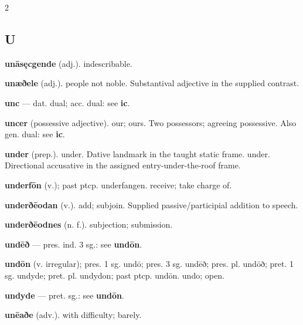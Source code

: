 \begin{multicols*}{2}
\subsection*{U}
\textbf{unāsęcgende} (adj.). indescribable.\par
\textbf{unæðele} (adj.). people not noble. Substantival adjective in the supplied contrast.\par
\textbf{unc} — dat. dual; acc. dual: see \textbf{ic}.\par
\textbf{uncer} (possessive adjective). our; ours. Two possessors; agreeing possessive. Also gen. dual: see \textbf{ic}.\par
\textbf{under} (prep.). under. Dative landmark in the taught static frame. under. Directional accusative in the assigned entry-under-the-roof frame.\par
\textbf{underfōn} (v.); past ptcp. underfangen. receive; take charge of.\par
\textbf{underðēodan} (v.). add; subjoin. Supplied passive/participial addition to speech.\par
\textbf{underðēodnes} (n. f.). subjection; submission.\par
\textbf{undēð} — pres. ind. 3 sg.: see \textbf{undōn}.\par
\textbf{undōn} (v. irregular); pres. 1 sg. undō; pres. 3 sg. undēð; pres. pl. undōð; pret. 1 sg. undyde; pret. pl. undydon; past ptcp. undōn. undo; open.\par
\textbf{undyde} — pret. sg.: see \textbf{undōn}.\par
\textbf{unēaðe} (adv.). with difficulty; barely.\par

\end{multicols*}
